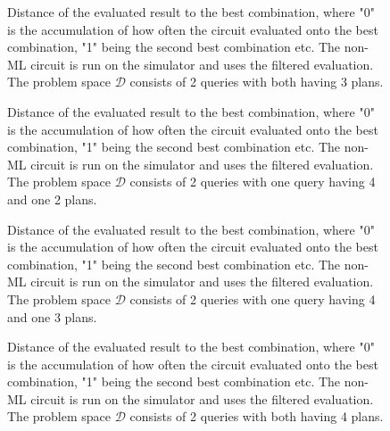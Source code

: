 \begin{figure}[!h]
    \centering
    \scalebox{\resultboxplot}{
        
    }
    \caption{Distance of the evaluated result to the best combination, where "0" is the accumulation of how often the circuit evaluated onto the best combination, "1" being the second best combination etc. The non-ML circuit is run on the simulator and uses the filtered evaluation. The problem space $\mathcal{D}$ consists of 2 queries with both having 3 plans.}
    \label{figure:bars_dist_3_3}
\end{figure}

\begin{figure}[!ht]
    \centering
    \scalebox{\resultboxplot}{
        
    }
    \caption{Distance of the evaluated result to the best combination, where "0" is the accumulation of how often the circuit evaluated onto the best combination, "1" being the second best combination etc. The non-ML circuit is run on the simulator and uses the filtered evaluation. The problem space $\mathcal{D}$ consists of 2 queries with one query having 4 and one 2 plans.}
    \label{figure:bars_dist_4_2}
\end{figure}

\begin{figure}[!h]
    \centering
    \scalebox{\resultboxplot}{
        
    }
    \caption{Distance of the evaluated result to the best combination, where "0" is the accumulation of how often the circuit evaluated onto the best combination, "1" being the second best combination etc. The non-ML circuit is run on the simulator and uses the filtered evaluation. The problem space $\mathcal{D}$ consists of 2 queries with one query having 4 and one 3 plans.}
    \label{figure:bars_dist_4_3}
\end{figure}

\begin{figure}[!h]
    \centering
    \scalebox{\resultboxplot}{
        
    }
    \caption{Distance of the evaluated result to the best combination, where "0" is the accumulation of how often the circuit evaluated onto the best combination, "1" being the second best combination etc. The non-ML circuit is run on the simulator and uses the filtered evaluation. The problem space $\mathcal{D}$ consists of 2 queries with both having 4 plans.}
    \label{figure:bars_dist_4_4}
\end{figure}

